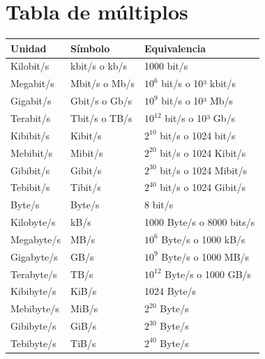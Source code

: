 \documentclass[a4paper, 11pt]{report} %
\begin{document}
\section*{Tabla de múltiplos}
\noindent
\begin{tabularx}{\columnwidth}{|X >{\centering}X X|}
\rowcolor{header} \hline
\textbf{Unidad} & \textbf{Símbolo} & \textbf{Equivalencia} \\ \hline
Kilobit/s & kbit/s o kb/s & 1000 bit/s \\
Megabit/s & Mbit/s o Mb/s & $10^{6}$ bit/s o 10³ kbit/s  \\
Gigabit/s & Gbit/s o Gb/s & $10^{9}$ bit/s o 10³ Mb/s \\
Terabit/s & Tbit/s o TB/s & $10^{12}$ bit/s o 10³ Gb/s \\ \hline
Kibibit/s & Kibit/s & $2^{10}$ bit/s o 1024 bit/s \\
Mebibit/s & Mibit/s & $2^{20}$ bit/s o 1024 Kibit/s \\
Gibibit/s & Gibit/s & $2^{30}$ bit/s o 1024 Mibit/s \\
Tebibit/s & Tibit/s & $2^{40}$ bit/s o 1024 Gibit/s \\ \hline \hline
Byte/s    & Byte/s & 8 bit/s \\
Kilobyte/s & kB/s & 1000 Byte/s o 8000 bits/s \\
Megabyte/s & MB/s & $10^{6}$ Byte/s o 1000 kB/s \\
Gigabyte/s & GB/s & $10^{9}$ Byte/s o 1000 MB/s \\
Terabyte/s & TB/s & $10^{12}$ Byte/s o 1000 GB/s \\ \hline
Kibibyte/s & KiB/s & 1024 Byte/s \\
Mebibyte/s & MiB/s & $2^{20}$ Byte/s \\
Gibibyte/s & GiB/s & $2^{30}$ Byte/s \\
Tebibyte/s & TiB/s & $2^{40}$ Byte/s \\ \hline
\end{tabularx}



\newpage
\thispagestyle{empty}
\vspace*{\fill}
\doclicenseThis
\vspace*{\fill}
\end{document}
